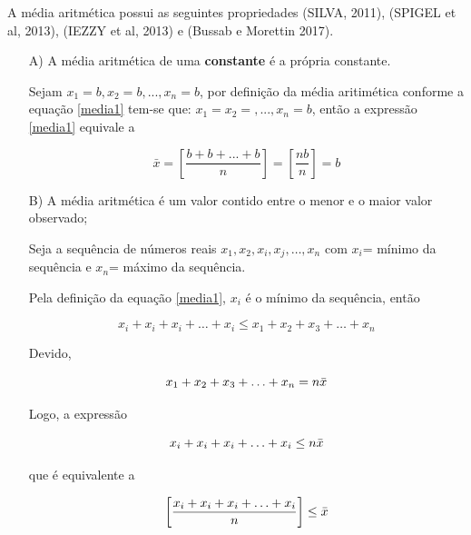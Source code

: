A média aritmética possui as seguintes propriedades (SILVA, 2011), (SPIGEL et al, 2013), (IEZZY et al, 2013) e (Bussab e Morettin 2017). 

\begin{enumerate}
\item [{A)}] A média aritmética de uma \textbf{constante} é a própria constante.

\vskip0.3cm
\textbf{} 

Sejam  $x_{1}=b, x_{2}=b, ..., x_{n}=b$, por definição da média aritimética conforme a equação \ref{media1} tem-se que: $x_{1}=x_{2}=,..., x_{n}=b$, então a expressão \ref{media1} equivale a

\begin{equation*}\label{propriedade1}
\bar{x} = \left[ \frac{b+b+...+b}{n} \right ] = \left [\frac{nb}{n} \right ]= b
\end{equation*}
 

\item [{B)}] A média aritmética é um valor contido entre o menor e o maior valor observado; 

\vskip0.3cm
\textbf{} 

Seja a sequência de números reais $x_{1},x_{2},x_{i},x_{j},\ldots,x_{n}$ com $x_{i}$= mínimo da sequência e $x_{n}$= máximo da sequência. \vskip0.3cm

Pela definição da equação \ref{media1}, $x_{i}$ é o mínimo da sequência, então 

\begin{equation*}\label{propriedade1}
x_{i}+x_{i}+x_{i}+\ldots+x_{i} \leq  x_{1}+x_{2}+x_{3}+\ldots+x_{n}
\end{equation*}

Devido,

\begin{equation*}\label{propriedade1}
x_{1}+x_{2}+x_{3}+\ldots+x_{n}=n \Bar{x}
\end{equation*}

Logo, a expressão

\begin{equation*}\label{propriedade1}
x_{i}+x_{i}+x_{i}+\ldots+x_{i} \leq n \Bar{x}
\end{equation*}

que é equivalente a 

\begin{equation*}\label{propriedade1}
\left[ \frac{x_{i}+x_{i}+x_{i}+\ldots+x_{i}}{n}  \right ] \leq \Bar{x}
\end{equation*}


\end{enumerate}
